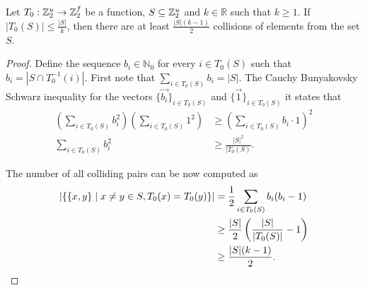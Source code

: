 \begin{lemma}
\label{lemma-collision-count}
Let $T_0: \mathbb{Z}_{2}^{u} \rightarrow \mathbb{Z}_{2}^{f}$ be a function, $S \subseteq \mathbb{Z}_{2}^{u}$ and $k \in \mathbb{R}$ such that $k \geq 1$. If $|T_0(S)| \leq \frac{|S|}{k}$, then there are at least $\frac{|S|(k - 1)}{2}$ collisions of elements from the set $S$.
\end{lemma} 
\begin{proof}
Define the sequence $b_i \in \mathbb{N}_0$ for every $i \in T_0(S)$ such that $b_i = \left|S \cap T_0^{-1}(i)\right|$. First note that $\sum_{i \in T_0(S)} b_i = |S|$. The Cauchy Bunyakovsky Schwarz inequality for the vectors $\{\vec{b_i}\}_{i \in T_0(S)}$ and $\{\vec{1}\}_{i \in T_0(S)}$ it states that
\[
\begin{split}
\displaystyle \left(\sum_{i \in T_0(S)} b_i ^ 2\right)\left(\sum_{i \in T_0(S)} 1 ^ 2\right) &\geq \left(\sum_{i \in T_0(S)} b_i \cdot 1 \right) ^ 2 \\ 
\displaystyle \sum_{i \in T_0(S)} b_i ^ 2 & \geq \frac{|S| ^ 2}{|T_0(S)} \text{.}
\end{split}
\]

The number of all colliding pairs can be now computed as
\[
\begin{split}
|\{ \{x, y\} \mid x \neq y \in S, T_0(x) = T_0(y) \}| 
	& = \frac{1}{2} \sum_{i \in T_0(S)} b_i (b_i - 1) \\ 
	& \geq \frac{|S|}{2}\left(\frac{|S|}{|T_0(S)|} - 1\right) \\
	& \geq \frac{|S|(k - 1)}{2} \text{.}
\end{split}
\]
\end{proof}

